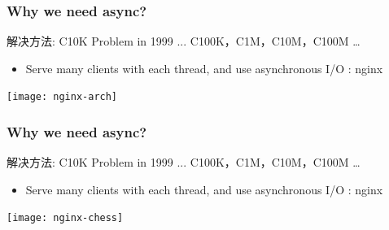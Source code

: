 \begin{frame}[fragile]	
	\frametitle{Why we need async?}
	
	解决方法: C10K Problem in 1999 ... C100K，C1M，C10M，C100M …
	\begin{itemize}
		\item Serve many clients with each thread, and use asynchronous I/O  : nginx
		
		
	\end{itemize}	
	
	\centering
	
	   
	\texttt{[image: nginx-arch]}
\end{frame}
\begin{frame}[fragile]	
    \frametitle{Why we need async?}
    
    解决方法: C10K Problem in 1999 ... C100K，C1M，C10M，C100M …
    \begin{itemize}
        \item Serve many clients with each thread, and use asynchronous I/O  : nginx
        
        
    \end{itemize}	
    
    \centering
    
    
    \texttt{[image: nginx-chess]}
\end{frame}



